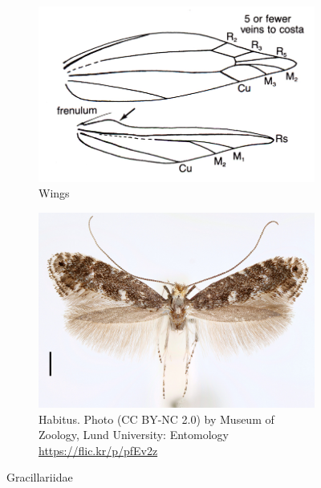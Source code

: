 \documentclass[letterpaper, 11pt]{article}
\begin{document}
\begin{figure}[ht!]
    \centering
    \begin{subfigure}[ht!]{0.4\textwidth}
        \includegraphics[width=\textwidth]{image33}
        \caption{Wings}%
        \label{fig:gracill1}
    \end{subfigure}
    \qquad %
    \begin{subfigure}[ht!]{0.45\textwidth}
        \includegraphics[width=\textwidth]{gracil}
        \caption{Habitus. Photo (CC BY-NC 2.0) by Museum of Zoology, Lund University: Entomology \url{https://flic.kr/p/pfEv2z}}
        \label{fig:gracill2}
    \end{subfigure}
    \caption{Gracillariidae}\label{fig:gracillariids}
\end{figure}
\end{document}
